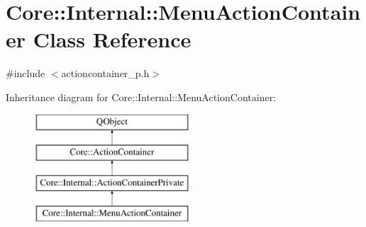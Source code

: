 \hypertarget{class_core_1_1_internal_1_1_menu_action_container}{\section{Core\-:\-:Internal\-:\-:Menu\-Action\-Container Class Reference}
\label{class_core_1_1_internal_1_1_menu_action_container}
}


{\ttfamily \#include $<$actioncontainer\-\_\-p.\-h$>$}

Inheritance diagram for Core\-:\-:Internal\-:\-:Menu\-Action\-Container\-:\begin{figure}[H]
\begin{center}
\leavevmode
\includegraphics[height=4.000000cm]{class_core_1_1_internal_1_1_menu_action_container}
\end{center}
\end{figure}
